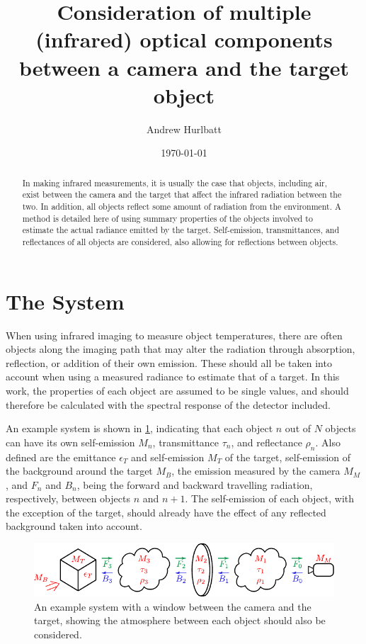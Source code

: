 \documentclass[11pt,a4paper]{article}
\title{Consideration of multiple (infrared) optical components between a camera and the target object}
\author{Andrew Hurlbatt}
\date{\today}
\begin{document}
	
	\maketitle
	
	\begin{abstract}
		In making infrared measurements, it is usually the case that objects, including air, exist between the camera and the target that affect the infrared radiation between the two. In addition, all objects reflect some amount of radiation from the environment. A method is detailed here of using summary properties of the objects involved to estimate the actual radiance emitted by the target. Self-emission, transmittances, and reflectances of all objects are considered, also allowing for reflections between objects.
	\end{abstract}

\section*{The System}

When using infrared imaging to measure object temperatures, there are often objects along the imaging path that may alter the radiation through absorption, reflection, or addition of their own emission. These should all be taken into account when using a measured radiance to estimate that of a target. In this work, the properties of each object are assumed to be single values, and should therefore be calculated with the spectral response of the detector included. 

An example system is shown in \cref{fig:scheme}, indicating that each object $ n $ out of $ N $ objects can have its own self-emission $ M_n $, transmittance $ \tau_n $, and reflectance $ \rho_n $. Also defined are the emittance $ \epsilon_T $ and self-emission $ M_T $ of the target, self-emission of the background around the target $ M_B $, the emission measured by the camera $ M_M $, and $ F_n $ and $ B_n $, being the forward and backward travelling radiation, respectively, between objects $ n $ and $ n+1 $. The self-emission of each object, with the exception of the target, should already have the effect of any reflected background taken into account.

\begin{figure}
	\centering
	\includegraphics[width=\textwidth]{./infroptics_scheme.pdf}
	\caption{An example system with a window between the camera and the target, showing the atmosphere between each object should also be considered.}
	\label{fig:scheme}
\end{figure}
\end{document}
